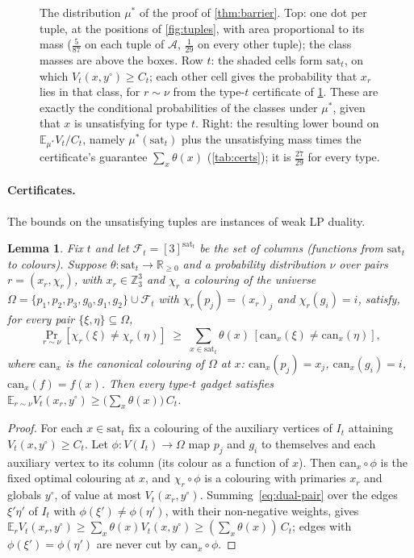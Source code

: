 \documentclass[11pt,letterpaper]{article}
\newtheorem{lemma}[theorem]{Lemma}
\theoremstyle{remark}
\newcommand{\Z}{\mathbb{Z}}
\newcommand{\R}{\mathbb{R}}
\newcommand{\sat}{\mathrm{sat}}
\newcommand{\can}{\mathrm{can}}
\newcommand{\yc}{y^{\circ}}
\begin{document}
\begin{figure}[t]
\centering

\caption{The distribution $\mu^\ast$ of the proof of \cref{thm:barrier}. Top: one dot per tuple, at the
positions of \cref{fig:tuples}, with area proportional to its mass ($\tfrac5{87}$ on each tuple of
$\mathcal A$, $\tfrac1{29}$ on every other tuple); the class masses are above the boxes. Row $t$: the
shaded cells form $\sat_t$, on which $V_t(x,\yc)\ge C_t$; each other cell gives the probability that $x_r$
lies in that class, for $r\sim\nu$ from the type-$t$ certificate of \cref{lem:dual}. These are exactly the
conditional probabilities of the classes under $\mu^\ast$, given that $x$ is unsatisfying for type $t$.
Right: the resulting lower bound on $\mathbb E_{\mu^\ast}V_t/C_t$, namely $\mu^\ast(\sat_t)$ plus the
unsatisfying mass times the certificate's guarantee $\sum_x\theta(x)$ (\cref{tab:certs}); it is
$\tfrac{27}{29}$ for every type.}
\label{fig:barrier}
\end{figure}

\paragraph{Certificates.}
The bounds on the unsatisfying tuples are instances of weak LP duality.

\begin{lemma}\label{lem:dual}
Fix $t$ and let $\mathcal F_t=[3]^{\sat_t}$ be the set of \emph{columns} (functions from
$\sat_t$ to colours). Suppose $\theta\colon\sat_t\to\R_{\ge0}$ and a probability
distribution $\nu$ over pairs $r=(x_r,\chi_r)$, with $x_r\in\Z_3^3$ and $\chi_r$ a colouring of the
\emph{universe} $\Omega=\{p_1,p_2,p_3,g_0,g_1,g_2\}\cup\mathcal F_t$ with $\chi_r(p_j)=(x_r)_j$ and
$\chi_r(g_i)=i$, satisfy, for every pair $\{\xi,\eta\}\subseteq\Omega$,
\begin{equation}\label{eq:dual-pair}
\Pr_{r\sim\nu}[\chi_r(\xi)\ne\chi_r(\eta)] \;\ge\; \sum_{x\in\sat_t}\theta(x)\,[\can_x(\xi)\ne\can_x(\eta)],
\end{equation}
where $\can_x$ is the canonical colouring of $\Omega$ at $x$: $\can_x(p_j)=x_j$, $\can_x(g_i)=i$,
$\can_x(f)=f(x)$. Then every type-$t$ gadget satisfies
$\mathbb E_{r\sim\nu}V_t(x_r,\yc)\ge\big(\sum_x\theta(x)\big)\,C_t$.
\end{lemma}

\begin{proof}
For each $x\in\sat_t$ fix a colouring of the auxiliary vertices of $I_t$ attaining $V_t(x,\yc)\ge C_t$.
Let $\phi\colon V(I_t)\to\Omega$ map $p_j$ and $g_i$ to themselves and each auxiliary vertex to its column
(its colour as a function of $x$). Then $\can_x\circ\phi$ is the fixed optimal colouring at $x$, and
$\chi_r\circ\phi$ is a colouring with primaries $x_r$ and globals $\yc$, of value at most $V_t(x_r,\yc)$.
Summing~\eqref{eq:dual-pair} over the edges $\xi'\eta'$ of $I_t$ with $\phi(\xi')\ne\phi(\eta')$, with their
non-negative weights, gives $\mathbb E_rV_t(x_r,\yc)\ge\sum_x\theta(x)V_t(x,\yc)\ge(\sum_x\theta(x))\,C_t$;
edges with $\phi(\xi')=\phi(\eta')$ are never cut by $\can_x\circ\phi$.
\end{proof}
\end{document}
